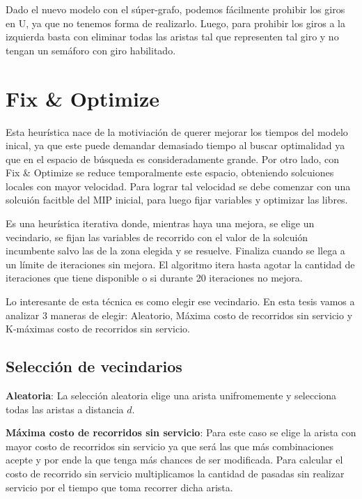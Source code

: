 Dado el nuevo modelo con el súper-grafo, podemos fácilmente prohibir los giros en U, ya que no 
tenemos forma de realizarlo. Luego, para prohibir los giros a la izquierda basta con eliminar todas 
las aristas tal que representen tal giro y no tengan un semáforo con giro habilitado.

\newpage

\section{Fix \& Optimize}

Esta heurística nace de la motiviación de querer mejorar los tiempos del modelo inical, ya que este 
puede demandar demasiado tiempo al buscar optimalidad ya que en el espacio de búsqueda es consideradamente
grande. Por otro lado, con Fix \& Optimize se reduce temporalmente este espacio, obteniendo solcuiones locales
con mayor velocidad. Para lograr tal velocidad se debe comenzar con una solcuión facitble del MIP inicial,
para luego fijar variables y optimizar las libres. 

\vspace{3mm}

Es una heurística
iterativa donde, mientras haya una mejora, se elige un vecindario, se fijan las variables de recorrido con 
el valor de la solcuión incumbente salvo las de la zona elegida y se resuelve. Finaliza cuando se llega 
a un límite de iteraciones sin mejora. El algoritmo  itera hasta agotar la cantidad de iteraciones que 
tiene disponible o si durante 20 iteraciones no mejora.

Lo interesante de esta técnica es como elegir ese vecindario. En esta tesis vamos a analizar 3
maneras de elegir: Aleatorio, Máxima costo de recorridos sin servicio y K-máximas costo de recorridos sin servicio.

\subsection{Selección de vecindarios}

\textbf{Aleatoria}: La selección aleatoria elige una arista unifromemente y selecciona todas las aristas
a distancia $d$.

\textbf{Máxima costo de recorridos sin servicio}: Para este caso se elige la arista con mayor costo de recorridos 
sin servicio ya que será las que más combinaciones acepte y por ende la que tenga más chances de ser modificada.
Para calcular el costo de recorrido sin servicio multiplicamos la cantidad de pasadas sin realizar servicio por
el tiempo que toma recorrer dicha arista.

